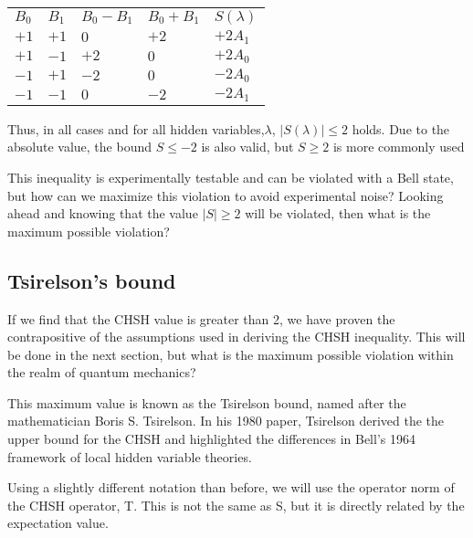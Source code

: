 \documentclass[12pt]{article}
\begin{document}
\begin{center}
\begin{tabular}{
  |>{\centering\arraybackslash}p{1.5cm}  %
  |>{\centering\arraybackslash}p{1.5cm} 
  |>{\centering\arraybackslash}p{1.5cm} 
  |>{\centering\arraybackslash}p{1.5cm} 
  |>{\centering\arraybackslash}p{1.5cm}| 
}
 \hline
 \multicolumn{5}{|c|}{All possible permutations} \\
 \hline
 \(B_0\) & \(B_1\) & \(B_0 - B_1\) & \(B_0 + B_1\) & \(S(\lambda)\) \\
 \hline
 \(+1\)   &  \(+1\)    & \(0\) &  \(+2\) & \(+2A_1\) \\
 \(+1\)   &  \(-1\)    & \(+2\)&  \(0\) & \(+2A_0\) \\
 \(-1\)   &  \(+1\)    & \(-2\)&  \(0\) & \(-2A_0\) \\
 \(-1\)   &  \(-1\)    & \(0\) &  \(-2\) & \(-2A_1\) \\
 \hline
\end{tabular}
\end{center}

Thus, in all cases and for all hidden variables,$\lambda$, $|S(\lambda)| \leq 2$ holds. Due to the absolute value, the bound $S \leq -2$ is also valid, but $S \geq 2$ is more commonly used

This inequality is experimentally testable and can be violated with a Bell state, but how can we maximize this violation to avoid experimental noise? Looking ahead and knowing that the value $|S| \geq 2$ will be violated, then what is the maximum possible violation?

\newpage
\subsection{Tsirelson’s bound}

If we find that the CHSH value is greater than 2, we have proven the contrapositive of the assumptions used in deriving the CHSH inequality. This will be done in the next section, but what is the maximum possible violation within the realm of quantum mechanics?

This maximum value is known as the Tsirelson bound, named after the mathematician Boris S. Tsirelson. In his 1980 paper, Tsirelson derived the the upper bound for the CHSH and highlighted the differences in Bell's 1964 framework of local hidden variable theories. \cite{Tsirelson_Paper} \cite{Bell1964}

Using a slightly different notation than before, we will use the operator norm of the CHSH operator, T. This is not the same as S, but it is directly related by the expectation value.
\end{document}

